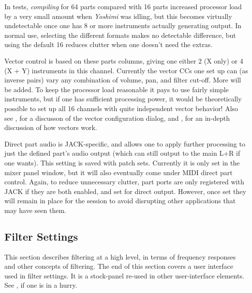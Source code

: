    In tests, \textsl{compiling} for 64 parts compared with 16 parts increased
   processor load by a very small amount when \textsl{Yoshimi} was idling,
   but this becomes virtually undetectable once one has 8 or more instruments
   actually generating output. In normal use, selecting the different formats
   makes no detectable difference, but using the default 16 reduces clutter
   when one doesn't need the extras.

   Vector control is based on these parts columns, giving one either 2 (X
   only) or 4 (X + Y) instruments in this channel. Currently the vector
   CCs one set up can (as inverse pairs) vary any combination of volume, pan,
   and filter cut-off.  More will be added.  To keep the processor load
   reasonable it pays to use fairly simple instruments, but if one has
   sufficient processing power, it would be theoretically possible to set up
   all 16 channels with quite independent vector behavior!
   Also see
   , for a discusson of the vector
   configuration dialog, and , for an in-depth
   discussion of how vectors work.

   Direct part audio is JACK-specific, and allows one to apply further
   processing to just the defined part's audio output (which can still output
   to the main L+R if one wants). This setting is saved with patch sets.
   Currently it is only set in the mixer panel window, but it will also
   eventually come under MIDI direct part control.  Again, to reduce
   unnecessary clutter, part ports are only registered with JACK if they are
   both enabled, and set for direct output. However, once set they will remain
   in place for the session to avoid disrupting other applications that may
   have seen them.

\subsection{Filter Settings}
\label{subsec:filter_settings}

   This section describes filtering at a high level, in terms of frequency
   responses and other concepts of filtering.
   The end of this section covers a user interface used in filter settings.
   It is a stock-panel re-used in other user-interface elements.
   See ,
   if one is in a hurry.

